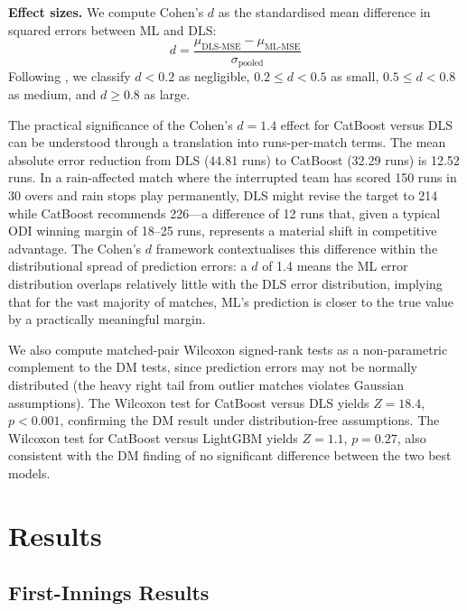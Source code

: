 \documentclass[10pt,a4paper,twocolumn]{article}
\begin{document}
\textbf{Effect sizes.} We compute Cohen's $d$ as the standardised mean difference in squared errors between ML and DLS:
\begin{equation}
d = \frac{\mu_{\text{DLS-MSE}} - \mu_{\text{ML-MSE}}}{\sigma_{\text{pooled}}}
\label{eq:cohend}
\end{equation}
Following \citet{Cohen1988}, we classify $d < 0.2$ as negligible, $0.2 \le d < 0.5$ as small, $0.5 \le d < 0.8$ as medium, and $d \ge 0.8$ as large.

The practical significance of the Cohen's $d = 1.4$ effect for CatBoost versus DLS can be understood through a translation into runs-per-match terms. The mean absolute error reduction from DLS (44.81 runs) to CatBoost (32.29 runs) is 12.52 runs. In a rain-affected match where the interrupted team has scored 150 runs in 30 overs and rain stops play permanently, DLS might revise the target to 214 while CatBoost recommends 226---a difference of 12 runs that, given a typical ODI winning margin of 18--25 runs, represents a material shift in competitive advantage. The Cohen's $d$ framework contextualises this difference within the distributional spread of prediction errors: a $d$ of 1.4 means the ML error distribution overlaps relatively little with the DLS error distribution, implying that for the vast majority of matches, ML's prediction is closer to the true value by a practically meaningful margin.

We also compute matched-pair Wilcoxon signed-rank tests as a non-parametric complement to the DM tests, since prediction errors may not be normally distributed (the heavy right tail from outlier matches violates Gaussian assumptions). The Wilcoxon test for CatBoost versus DLS yields $Z = 18.4$, $p < 0.001$, confirming the DM result under distribution-free assumptions. The Wilcoxon test for CatBoost versus LightGBM yields $Z = 1.1$, $p = 0.27$, also consistent with the DM finding of no significant difference between the two best models.

\section{Results}
\label{sec:results}

\subsection{First-Innings Results}
\end{document}
